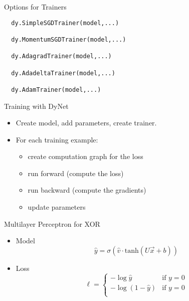 \documentclass[compress]{beamer}
\begin{document}
\begin{frame}[fragile]{Options for Trainers}

\begin{verbatim}
  dy.SimpleSGDTrainer(model,...)

  dy.MomentumSGDTrainer(model,...)

  dy.AdagradTrainer(model,...)

  dy.AdadeltaTrainer(model,...)

  dy.AdamTrainer(model,...)
\end{verbatim}

\end{frame}

\begin{frame}{Training with DyNet}

\begin{itemize}
\item Create model, add parameters, create trainer.
\item For each training example:
\begin{itemize}
  \item create computation graph for the loss
  \item run forward (compute the loss)
  \item run backward (compute the gradients)
  \item update parameters
\end{itemize}
\end{itemize}

\end{frame}

\begin{frame}{Multilayer Perceptron for XOR}

\begin{itemize}
  \item Model
    \begin{equation}
      \hat y = \sigma(\hat v \cdot \mbox{tanh}(U \vec x + b))
      \end{equation}
      \item Loss
        \begin{equation}
        \ell = \begin{cases} - \log \hat y & \mbox{if }y = 0\\
          - \log (1 - \hat y) & \mbox{if }y = 0\\
          \end{cases}
          \end{equation}
\end{itemize}

\end{frame}
\end{document}
